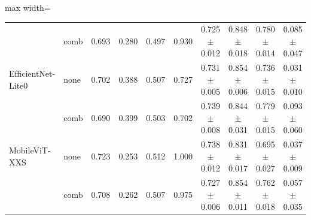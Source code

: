 \begin{table}[ht]
\begin{adjustbox}{max width=\textwidth}
\begin{tabular}{llcccc@{\hskip 6pt}cccc}
                       & comb & 0.693 & 0.280 & 0.497 & 0.930 & 0.725 $\pm$ 0.012 & 0.848 $\pm$ 0.018 & 0.780 $\pm$ 0.014 & 0.085 $\pm$ 0.047 \\
EfficientNet-Lite0     & none & 0.702 & 0.388 & 0.507 & 0.727 & 0.731 $\pm$ 0.005 & 0.854 $\pm$ 0.006 & 0.736 $\pm$ 0.015 & 0.031 $\pm$ 0.010 \\
                       & comb & 0.690 & 0.399 & 0.503 & 0.702 & 0.739 $\pm$ 0.008 & 0.844 $\pm$ 0.031 & 0.779 $\pm$ 0.015 & 0.093 $\pm$ 0.060 \\
MobileViT-XXS          & none & 0.723 & 0.253 & 0.512 & 1.000 & 0.738 $\pm$ 0.012 & 0.831 $\pm$ 0.017 & 0.695 $\pm$ 0.027 & 0.037 $\pm$ 0.009 \\
                       & comb & 0.708 & 0.262 & 0.507 & 0.975 & 0.727 $\pm$ 0.006 & 0.854 $\pm$ 0.011 & 0.762 $\pm$ 0.018 & 0.057 $\pm$ 0.035 \\
\bottomrule
\end{tabular}
\end{adjustbox}
\end{table}
